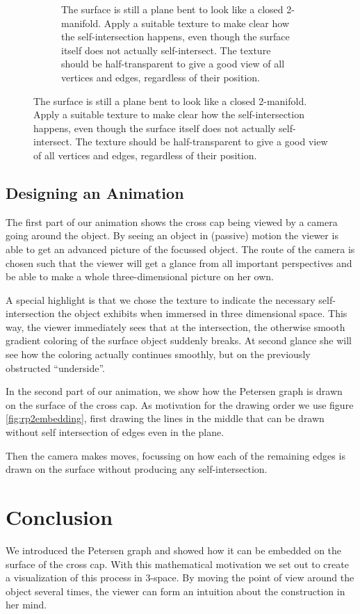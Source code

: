 \documentclass[11pt,            %
               a4paper,         %
               oneside,         %
               DIV12,           %
               fleqn,           %
               halfparskip,     %
               nochapterprefix, %
              ]{scrartcl} %
\theoremstyle{definition}
\begin{document}
\begin{figure}[h]
\begin{subfigure}[t]{0.49\textwidth}
    \caption{The surface is still a plane bent to look like a closed
      2-manifold. Apply a suitable texture to make clear how the
      self-intersection happens, even though the surface itself does
      not actually self-intersect. The texture should be
      half-transparent to give a good view of all vertices and edges,
      regardless of their position.}
  \end{subfigure}
\end{figure}

\subsection{Designing an Animation}

The first part of our animation shows the cross cap being viewed by a
camera going around the object. By seeing an object in (passive)
motion the viewer is able to get an advanced picture of the focussed
object. The route of the camera is chosen such that the viewer will
get a glance from all important perspectives and be able to make a whole
three-dimensional picture on her own.

A special highlight is that we chose the texture to indicate the
necessary self-intersection the object exhibits when immersed
in three dimensional space. This way, the viewer immediately sees that at the
intersection, the otherwise smooth gradient coloring
of the surface object suddenly breaks. At second glance she will see
how the coloring actually continues smoothly, but on the previously
obstructed “underside”.

In the second part of our animation, we show how the Petersen graph is drawn
on the surface of the cross cap. As motivation for the drawing order
we use figure \ref{fig:rp2embedding}, first drawing the lines in the
middle that can be drawn without self intersection of edges even in
the plane.

Then the camera makes moves, focussing on how each of the
remaining edges is drawn on the surface without producing any
self-intersection.

\section{Conclusion}

We introduced the Petersen graph and showed how it can be embedded on
the surface of the cross cap. With this mathematical motivation we set
out to create a visualization of this process in 3-space. By moving
the point of view around the object several times, the viewer can form
an intuition about the construction in her mind.


\nocite{*}


\end{document}
